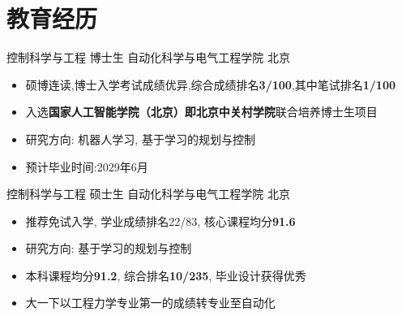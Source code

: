 \section{教育经历}


控制科学与工程 \quad 博士生 \quad 自动化科学与电气工程学院 \hfill 北京

\begin{itemize}
  \item 硕博连读,博士入学考试成绩优异,综合成绩排名\textcolor{ICBlue}{\textbf{3/100}},其中笔试排名\textcolor{ICBlue}{\textbf{1/100}}
  \item 入选\textcolor{ICBlue}{\textbf{国家人工智能学院（北京）即北京中关村学院}}联合培养博士生项目
  \item 研究方向: 机器人学习, 基于学习的规划与控制
  \item 预计毕业时间:2029年6月
\end{itemize}


控制科学与工程 \quad 硕士生 \quad 自动化科学与电气工程学院 \hfill {北京}
\begin{itemize}
  \item 推荐免试入学, 学业成绩排名22/83, 核心课程均分\textcolor{ICBlue}{\textbf{91.6}}
  \item 研究方向: 基于学习的规划与控制
\end{itemize}

\begin{itemize}
  \item 本科课程均分\textcolor{ICBlue}{\textbf{91.2}}, 综合排名\textcolor{ICBlue}{\textbf{10/235}}, 毕业设计获得优秀
  \item 大一下以工程力学专业第一的成绩转专业至自动化
\end{itemize}

